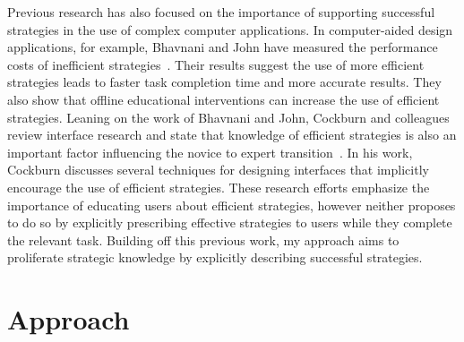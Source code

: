 \documentclass{sig-alternate}
\begin{document}
Previous research has also focused on the importance of supporting successful strategies in the use of complex computer applications.
In computer-aided design applications, for example, Bhavnani and John have measured the performance costs of inefficient strategies~\cite{Bhavnani2000}.
Their results suggest the use of more efficient strategies leads to faster task completion time and more accurate results.
They also show that offline educational interventions can increase the use of efficient strategies.
Leaning on the work of Bhavnani and John, Cockburn and colleagues review interface research and state that knowledge of efficient strategies is also an important factor influencing the novice to expert transition~\cite{Cockburn2014}.
In his work, Cockburn discusses several techniques for designing interfaces that implicitly encourage the use of efficient strategies.
These research efforts emphasize the importance of educating users about efficient strategies, however neither proposes to do so by explicitly prescribing effective strategies to users while they complete the relevant task.
Building off this previous work, my approach aims to proliferate strategic knowledge by explicitly describing successful strategies. 








 
 



\section{Approach}
\label{sec:approach}
\end{document}

